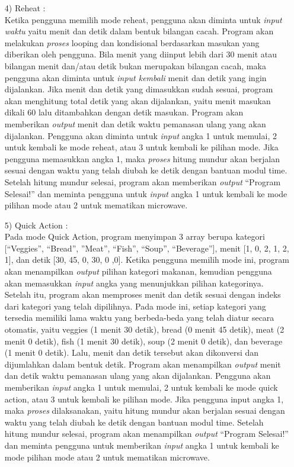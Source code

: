 \documentclass[conference]{IEEEtran}
\begin{document}
\begin{enumerate}
\item[4)] Reheat :\\
Ketika pengguna memilih mode reheat, pengguna akan diminta untuk \textit{input waktu} yaitu menit dan detik dalam bentuk bilangan cacah. Program akan melakukan \textit{proses} looping dan kondisional berdasarkan masukan yang diberikan 
oleh pengguna. Bila menit yang diinput lebih dari 30 menit atau bilangan menit dan/atau detik bukan merupakan bilangan cacah, maka pengguna akan diminta untuk \textit{input kembali} menit dan detik yang ingin dijalankan. Jika menit dan detik 
yang dimasukkan sudah sesuai, program akan menghitung total detik yang akan dijalankan, yaitu menit masukan dikali 60 lalu ditambahkan dengan detik masukan. Program akan memberikan \textit{output} menit dan detik waktu pemanasan ulang yang akan dijalankan. 
Pengguna akan diminta untuk \textit{input} angka 1 untuk memulai, 2 untuk kembali ke mode reheat, atau 3 untuk kembali ke pilihan mode. Jika pengguna memasukkan angka 1, maka \textit{proses} hitung mundur akan berjalan sesuai dengan waktu yang telah 
diubah ke detik dengan bantuan modul time. Setelah hitung mundur selesai, program akan memberikan \textit{output} “Program Selesai!” dan meminta pengguna untuk \textit{input} angka 1 untuk kembali ke mode pilihan mode atau 2 untuk mematikan microwave.
 
\item[5)] Quick Action :\\
Pada mode Quick Action, program menyimpan 3 array berupa kategori [“Veggies”, “Bread”, ”Meat”, “Fish”, “Soup”, “Beverage”], menit [1, 0, 2, 1, 2, 1], dan detik [30, 45, 0, 30, 0 ,0]. Ketika pengguna memilih mode ini, program akan menampilkan \textit{output} 
pilihan kategori makanan, kemudian pengguna akan memasukkan \textit{input} angka yang menunjukkan pilihan kategorinya. Setelah itu, program akan memproses menit dan detik sesuai dengan indeks dari kategori yang telah dipilihnya. Pada mode ini, setiap kategori 
yang tersedia memiliki lama waktu yang berbeda-beda yang telah diatur secara otomatis, yaitu veggies (1 menit 30 detik), bread (0 menit 45 detik), meat (2 menit 0 detik), fish (1 menit 30 detik), soup (2 menit 0 detik), dan beverage (1 menit 0 detik). Lalu, menit dan 
detik tersebut akan dikonversi dan dijumlahkan dalam bentuk detik. Program akan menampilkan \textit{output} menit dan detik waktu pemanasan ulang yang akan dijalankan. Pengguna akan memberikan \textit{input} angka 1 untuk memulai, 2 untuk kembali ke mode quick action, atau 3 untuk 
kembali ke pilihan mode. Jika pengguna input angka 1, maka \textit{proses} dilaksanakan, yaitu hitung mundur akan berjalan sesuai dengan waktu yang telah diubah ke detik dengan bantuan modul time. Setelah hitung mundur selesai, program akan menampilkan \textit{output} 
“Program Selesai!” dan meminta pengguna untuk memberikan \textit{input} angka 1 untuk kembali ke mode pilihan mode atau 2 untuk mematikan microwave.
\end{enumerate} 
\end{document}
